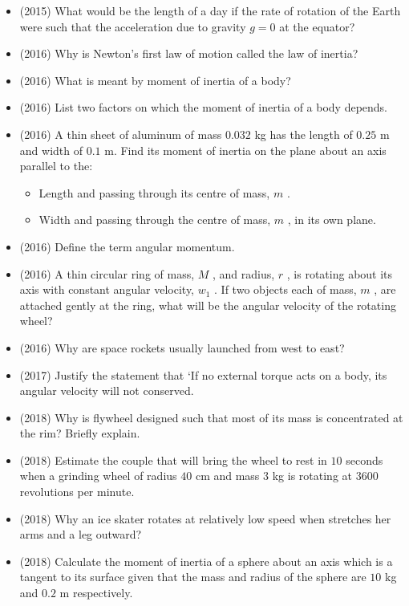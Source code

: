 \documentclass{article}
\begin{document}
\begin{itemize}
\begin{itemize}
\end{itemize}
\item (2015)  What would be the length of a day if the rate of rotation of the Earth were such that the acceleration due to gravity $ g=0$ at the equator?
\item (2016)  Why is Newton’s first law of motion called the law of inertia?
\item (2016)  What is meant by moment of inertia of a body?
\item (2016)  List two factors on which the moment of inertia of a body depends. 
\item (2016)  A thin sheet of aluminum of mass $ 0.032$ kg has the length of $ 0.25$ m and width of $ 0.1$ m. Find its moment of inertia on the plane about an axis parallel to the:
 \begin{itemize}
\item Length and passing through its centre of mass, $ m$ .
\item Width and passing through the centre of mass, $ m$ , in its own plane.
\end{itemize}
\item (2016)  Define the term angular momentum.
\item (2016)  A thin circular ring of mass, $ M$ , and radius, $ r$ , is rotating about its axis with constant angular velocity, $ w_{1}$ .  If two objects each of mass, $ m$ , are attached gently at the ring, what will be the angular velocity of the rotating wheel?
\item (2016)  Why are space rockets usually launched from west to east?
\item (2017)  Justify the statement that ‘If no external torque acts on a body, its angular velocity will not conserved.
\item (2018)  Why is flywheel designed such that most of its mass is concentrated at the rim? Briefly explain. 
\item (2018)  Estimate the couple that will bring the wheel to rest in $ 10$ seconds when a grinding wheel of radius $ 40$ cm and mass $ 3$ kg is rotating at $ 3600$ revolutions per minute. 
\item (2018)  Why an ice skater rotates at relatively low speed when stretches her arms and a leg outward? 
\item (2018)  Calculate the moment of inertia of a sphere about an axis which is a tangent to its surface given that the mass and radius of the sphere are $ 10$ kg and $ 0.2$ m respectively. 
\end{itemize}
\end{document}
